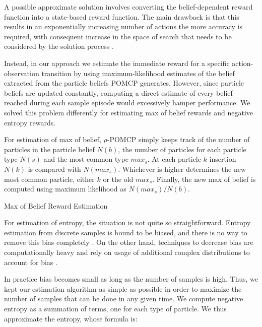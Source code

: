 A possible approximate solution involves converting the belief-dependent reward function into a
state-based reward function. The main drawback is that this results in an exponentially increasing
number of actions the more accuracy is required, with consequent increase in the space of search
that needs to be considered by the solution process \cite{cit:rpomdp}.

Instead, in our approach we estimate the immediate reward for a specific action-observation
transition by using maximum-likelihood estimates of the belief extracted from the particle beliefs
POMCP generates. However, since particle beliefs are updated constantly, computing a direct estimate
of every belief reached during each sample episode would excessively hamper performance. We solved
this problem differently for estimating max of belief rewards and negative entropy rewards.

For estimation of max of belief, $\rho$-POMCP simply keeps track of the number of particles in the
particle belief $N(b)$, the number of particles for each particle type $N(s)$ and the most common
type $max_s$. At each particle $k$ insertion $N(k)$ is compared with $N(max_s)$. Whichever is higher
determines the new most common particle, either $k$ or the old $max_s$. Finally, the new max of
belief is computed using maximum likelihood as $N(max_s)/N(b)$.

\begin{algorithm}[H]
    \caption{Max of Belief Reward Estimation}

\end{algorithm}

For estimation of entropy, the situation is not quite so straightforward. Entropy estimation from
discrete samples is bound to be biased, and there is no way to remove this bias completely
\cite{cit:badentropy}. On the other hand, techniques to decrease bias are computationally heavy and
rely on usage of additional complex distributions to account for bias \cite{cit:entropyfixes}.

In practice bias becomes small as long as the number of samples is high. Thus, we kept our
estimation algorithm as simple as possible in order to maximize the number of samples that can be
done in any given time. We compute negative entropy as a summation of terms, one for each type of
particle. We thus approximate the entropy, whose formula is:

